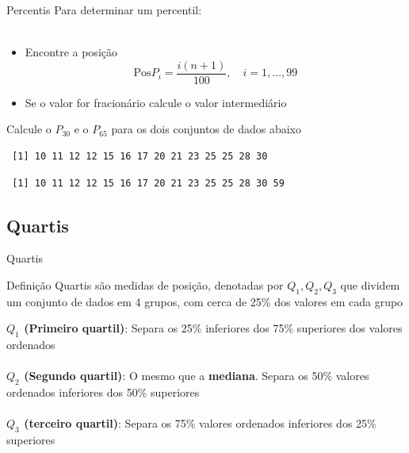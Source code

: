 \documentclass[10pt]{beamer}\usepackage[]{graphicx}\usepackage[]{color}
\makeatletter
\newenvironment{kframe}{%
 \def\at@end@of@kframe{}%
 \ifinner\ifhmode%
  \def\at@end@of@kframe{\end{minipage}}%
  \begin{minipage}{\columnwidth}%
 \fi\fi%
 \def\FrameCommand##1{\hskip\@totalleftmargin \hskip-\fboxsep
 \colorbox{shadecolor}{##1}\hskip-\fboxsep
     \hskip-\linewidth \hskip-\@totalleftmargin \hskip\columnwidth}%
 \MakeFramed {\advance\hsize-\width
   \@totalleftmargin\z@ \linewidth\hsize
   \@setminipage}}%
 {\par\unskip\endMakeFramed%
 \at@end@of@kframe}
\newenvironment{knitrout}{}{} %
\theoremstyle{definition}
\makeatother
\begin{document}
\begin{frame}[fragile]{Percentis}
  Para determinar um percentil: \\~\\
  \begin{itemize}
  \item Encontre a posição
    \begin{equation*}
      \text{Pos} P_i = \frac{i(n+1)}{100}, \quad i=1,\ldots,99
    \end{equation*}
  \item Se o valor for fracionário calcule o valor intermediário
  \end{itemize}
  \vspace{1em}
  Calcule o $P_{30}$ e o $P_{65}$ para os dois conjuntos de dados abaixo
\begin{knitrout}\footnotesize
{}\color{fgcolor}\begin{kframe}
\begin{verbatim}
 [1] 10 11 12 12 15 16 17 20 21 23 25 25 28 30
\end{verbatim}
\end{kframe}
\end{knitrout}
\begin{knitrout}\footnotesize
{}\color{fgcolor}\begin{kframe}
\begin{verbatim}
 [1] 10 11 12 12 15 16 17 20 21 23 25 25 28 30 59
\end{verbatim}
\end{kframe}
\end{knitrout}

\end{frame}

\subsection{Quartis}

\begin{frame}{Quartis}
  \begin{block}{Definição}
    Quartis são medidas de posição, denotadas por $Q_1, Q_2, Q_3$
    que dividem um conjunto de dados em 4 grupos, com cerca de 25\% dos
    valores em cada grupo
  \end{block}
  \textbf{$Q_1$ (Primeiro quartil)}: Separa os 25\% inferiores dos 75\%
  superiores dos valores ordenados\\~\\
  \textbf{$Q_2$ (Segundo quartil)}: O mesmo que a \textbf{mediana}. Separa os
  50\% valores ordenados inferiores dos 50\% superiores\\~\\
  \textbf{$Q_3$ (terceiro quartil)}: Separa os 75\% valores ordenados
  inferiores dos 25\% superiores
\end{frame}
\end{document}

